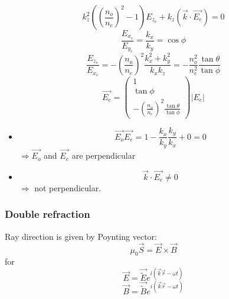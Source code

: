 \documentclass[10pt]{article}
\begin{document}
\begin{equation*}
k_z ^2 (\left(\frac{n_o}{n_e}\right)^2 - 1)E_{z_e} + k_z(\vec{k} \cdot \vec{E_e}) = 0
\end{equation*}
\begin{equation*}
\frac{E_{x_e}}{E_{y_e}} = \frac{k_x}{k_y} = \cos{\phi}
\end{equation*}
\begin{equation*}
\frac{E_{z_e}}{E_{x_e}} = -\left(\frac{n_o}{n_e}\right)^2 \frac{k_x ^2 + k_y ^2}{k_x k_z} = -\frac{n_o ^2}{n_e ^2}\frac{\tan{\theta}}{\tan{\phi}}
\end{equation*}
\begin{equation}\boxed{
\vec{E_e} = \begin{pmatrix}
1\\
\tan{\phi}\\
-\left(\frac{n_o}{n_e}\right)^2 \frac{\tan{\theta}}{\tan{\phi}}
\end{pmatrix} |E_e|
}\end{equation}
\begin{itemize}
\item[(i)] \begin{equation*}
\vec{E_o}\vec{E_e} = 1 - \frac{k_x}{k_y}\frac{k_y}{k_x} + 0 = 0
\end{equation*}
$\Rightarrow \vec{E_o}$ and $\vec{E_e}$ are perpendicular
\item[(ii)] \begin{equation*}
\vec{k} \cdot \vec{E_e} \neq 0
\end{equation*}
$\Rightarrow$ not perpendicular.
\end{itemize}

\subsubsection{Double refraction}
Ray direction is given by Poynting vector:
\begin{equation*}
\mu_0 \vec{S} = \vec{E} \times \vec{B}
\end{equation*}
for
\begin{equation*}
\vec{E} = \vec{\tilde{E}} e^{i(\vec{k}\vec{r} - \omega t)}
\end{equation*}
\begin{equation*}
\vec{B} = \vec{\tilde{B}} e^{i(\vec{k}\vec{r} - \omega t)}
\end{equation*}
\end{document}
